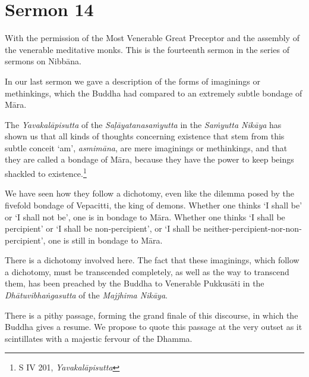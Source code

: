 \chapter{Sermon 14}

\NibbanaOpeningQuote

With the permission of the Most Venerable Great Preceptor and the assembly of the venerable meditative monks. This is the fourteenth sermon in the series of sermons on Nibbāna.

In our last sermon we gave a description of the forms of imaginings or methinkings, which the Buddha had compared to an extremely subtle bondage of Māra.

The \emph{Yavakalāpisutta} of the \emph{Saḷāyatanasaṁyutta} in the \emph{Saṁyutta Nikāya} has shown us that all kinds of thoughts concerning existence that stem from this subtle conceit `am', \emph{asmimāna}, are mere imaginings or methinkings, and that they are called a bondage of Māra, because they have the power to keep beings shackled to existence.\footnote{S IV 201, \emph{Yavakalāpisutta}}

We have seen how they follow a dichotomy, even like the dilemma posed by the fivefold bondage of Vepacitti, the king of demons. Whether one thinks `I shall be' or `I shall not be', one is in bondage to Māra. Whether one thinks `I shall be percipient' or `I shall be non-percipient', or `I shall be neither-percipient-nor-non-percipient', one is still in bondage to Māra.

There is a dichotomy involved here. The fact that these imaginings, which follow a dichotomy, must be transcended completely, as well as the way to transcend them, has been preached by the Buddha to Venerable Pukkusāti in the \emph{Dhātuvibhaṅgasutta} of the \emph{Majjhima Nikāya}.

There is a pithy passage, forming the grand finale of this discourse, in which the Buddha gives a resume. We propose to quote this passage at the very outset as it scintillates with a majestic fervour of the Dhamma.

